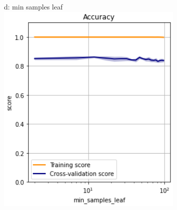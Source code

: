 \documentclass{article}
\begin{document}
\begin{figure}
\begin{subfigure}{.19\textwidth}
	\end{subfigure}
	\begin{subfigure}{.19\textwidth}
		\centering
		d: min samples leaf\\
		\includegraphics[width=\linewidth]{poland_xgb_min_samples_leaf_accuracy.png}
		

\end{subfigure}
\end{figure}
\end{document}
